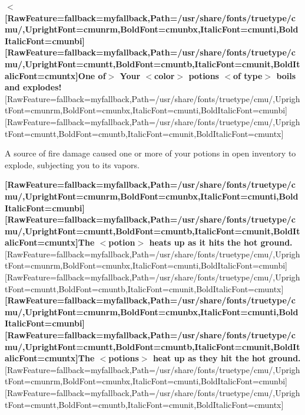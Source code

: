 {\bfseries {\mbox{$<$}}\allowbreak{}\setmainfont{cmunbx.ttf}[RawFeature={fallback=myfallback},Path=/usr/share/fonts/truetype/cmu/,UprightFont=cmunrm,BoldFont=cmunbx,ItalicFont=cmunti,BoldItalicFont=cmunbi]\setmonofont{cmunbx.ttf}[RawFeature={fallback=myfallback},Path=/usr/share/fonts/truetype/cmu/,UprightFont=cmuntt,BoldFont=cmuntb,ItalicFont=cmunit,BoldItalicFont=cmuntx]\bfseries One of{\mbox{$>$}} Your {\mbox{$<$}}color{\mbox{$>$}} potions {\mbox{$<$}}of type{\mbox{$>$}} boils and explodes!}\allowbreak{}\setmainfont{cmunrm.ttf}[RawFeature={fallback=myfallback},Path=/usr/share/fonts/truetype/cmu/,UprightFont=cmunrm,BoldFont=cmunbx,ItalicFont=cmunti,BoldItalicFont=cmunbi]\setmonofont{cmunrm.ttf}[RawFeature={fallback=myfallback},Path=/usr/share/fonts/truetype/cmu/,UprightFont=cmuntt,BoldFont=cmuntb,ItalicFont=cmunit,BoldItalicFont=cmuntx]

\begin{myquote}
\item{}A source of fire damage caused one or more of your potions in open inventory to explode, subjecting you to its vapors.
\end{myquote}

{\bfseries \allowbreak{}\setmainfont{cmunbx.ttf}[RawFeature={fallback=myfallback},Path=/usr/share/fonts/truetype/cmu/,UprightFont=cmunrm,BoldFont=cmunbx,ItalicFont=cmunti,BoldItalicFont=cmunbi]\setmonofont{cmunbx.ttf}[RawFeature={fallback=myfallback},Path=/usr/share/fonts/truetype/cmu/,UprightFont=cmuntt,BoldFont=cmuntb,ItalicFont=cmunit,BoldItalicFont=cmuntx]\bfseries The {\mbox{$<$}}potion{\mbox{$>$}} heats up as it hits the hot ground.}\allowbreak{}\setmainfont{cmunrm.ttf}[RawFeature={fallback=myfallback},Path=/usr/share/fonts/truetype/cmu/,UprightFont=cmunrm,BoldFont=cmunbx,ItalicFont=cmunti,BoldItalicFont=cmunbi]\setmonofont{cmunrm.ttf}[RawFeature={fallback=myfallback},Path=/usr/share/fonts/truetype/cmu/,UprightFont=cmuntt,BoldFont=cmuntb,ItalicFont=cmunit,BoldItalicFont=cmuntx]
{\bfseries \allowbreak{}\setmainfont{cmunbx.ttf}[RawFeature={fallback=myfallback},Path=/usr/share/fonts/truetype/cmu/,UprightFont=cmunrm,BoldFont=cmunbx,ItalicFont=cmunti,BoldItalicFont=cmunbi]\setmonofont{cmunbx.ttf}[RawFeature={fallback=myfallback},Path=/usr/share/fonts/truetype/cmu/,UprightFont=cmuntt,BoldFont=cmuntb,ItalicFont=cmunit,BoldItalicFont=cmuntx]\bfseries The {\mbox{$<$}}potions{\mbox{$>$}} heat up as they hit the hot ground.}\allowbreak{}\setmainfont{cmunrm.ttf}[RawFeature={fallback=myfallback},Path=/usr/share/fonts/truetype/cmu/,UprightFont=cmunrm,BoldFont=cmunbx,ItalicFont=cmunti,BoldItalicFont=cmunbi]\setmonofont{cmunrm.ttf}[RawFeature={fallback=myfallback},Path=/usr/share/fonts/truetype/cmu/,UprightFont=cmuntt,BoldFont=cmuntb,ItalicFont=cmunit,BoldItalicFont=cmuntx]

